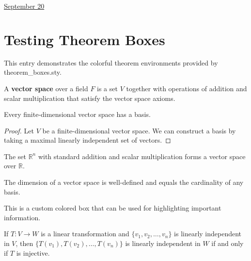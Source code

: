 \documentclass[11pt,letterpaper]{article}
\begin{document}
\href{run:2025-09-20-theorem-test.tex}{\Huge September 20} %

\section*{Testing Theorem Boxes}

This entry demonstrates the colorful theorem environments provided by theorem\_boxes.sty.

\begin{definition}
A \textbf{vector space} over a field $F$ is a set $V$ together with operations of addition and scalar multiplication that satisfy the vector space axioms.
\end{definition}

\begin{theorem}
Every finite-dimensional vector space has a basis.
\end{theorem}

\begin{proof}
Let $V$ be a finite-dimensional vector space. We can construct a basis by taking a maximal linearly independent set of vectors.
\end{proof}

\begin{example}
The set $\mathbb{R}^n$ with standard addition and scalar multiplication forms a vector space over $\mathbb{R}$.
\end{example}

\begin{remark}
The dimension of a vector space is well-defined and equals the cardinality of any basis.
\end{remark}

\begin{cbox}
This is a custom colored box that can be used for highlighting important information.
\end{cbox}

\begin{lemma}
If $T: V \to W$ is a linear transformation and $\{v_1, v_2, \ldots, v_n\}$ is linearly independent in $V$, then $\{T(v_1), T(v_2), \ldots, T(v_n)\}$ is linearly independent in $W$ if and only if $T$ is injective.
\end{lemma}

 
\end{document}
